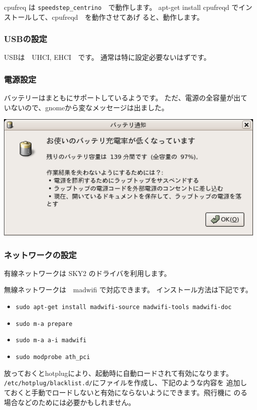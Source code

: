 \documentclass[mingoth,a4paper]{jsarticle}
\begin{document}
cpufreq は \texttt{speedstep\_centrino}　で動作します。
apt-get install cpufreqd でインストールして、cpufreqd　を動作させてあげ
ると、動作します。

\subsubsection{USBの設定}

USBは　UHCI, EHCI　です。
通常は特に設定必要ないはずです。

\subsubsection{電源設定}

バッテリーはまともにサポートしているようです。
ただ、電源の全容量が出ていないので、gnomeから変なメッセージは出ました。

\includegraphics[width=0.8\hsize]{image200607/batterylo.png}

\subsubsection{ネットワークの設定}

有線ネットワークは SKY2 のドライバを利用します。

無線ネットワークは　madwifi で対応できます。
インストール方法は下記です。

\begin{itemize}
  \item \texttt{sudo apt-get install madwifi-source madwifi-tools madwifi-doc}
  \item \texttt{sudo m-a prepare}
  \item \texttt{sudo m-a a-i madwifi}
  \item \texttt{sudo modprobe ath\_pci}
\end{itemize}

放っておくとhotplugにより、起動時に自動ロードされて有効になります。
\texttt{/etc/hotplug/blacklist.d/}にファイルを作成し、下記のような内容を
追加しておくと手動でロードしないと有効にならないようにできます。飛行機に
のる場合などのためには必要かもしれません。
\end{document}
